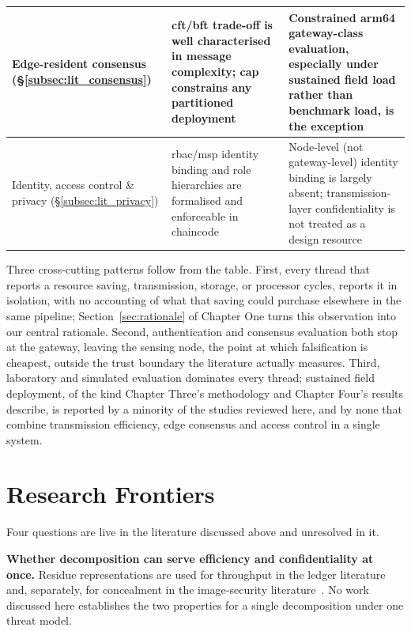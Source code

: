 \begin{table}[htbp]
\begin{tabularx}{\textwidth}{@{}p{}X X@{}}
\midrule
Edge-resident consensus (\S\ref{subsec:lit_consensus})
  & \gls{cft}/\gls{bft} trade-off is well characterised in message
    complexity; \gls{cap} constrains any partitioned deployment
  & Constrained \gls{arm64} gateway-class evaluation, especially under
    sustained field load rather than benchmark load, is the exception \\
\midrule
Identity, access control \& privacy (\S\ref{subsec:lit_privacy})
  & \gls{rbac}/\gls{msp} identity binding and role hierarchies are
    formalised and enforceable in chaincode
  & Node-level (not gateway-level) identity binding is largely absent;
    transmission-layer confidentiality is not treated as a design resource \\
\bottomrule
\end{tabularx}
\end{table}

Three cross-cutting patterns follow from the table. First, every thread
that reports a resource saving, transmission, storage, or processor
cycles, reports it in isolation, with no accounting of what that saving
could purchase elsewhere in the same pipeline; Section~\ref{sec:rationale}
of Chapter One turns this observation into our central rationale.
Second, authentication and consensus evaluation both stop at the gateway,
leaving the sensing node, the point at which falsification is cheapest,
outside the trust boundary the literature actually measures. Third,
laboratory and simulated evaluation dominates every thread; sustained
field deployment, of the kind Chapter Three's methodology and Chapter
Four's results describe, is reported by a minority of the studies
reviewed here, and by none that combine transmission efficiency, edge
consensus and access control in a single system.

\section{Research Frontiers}
\label{sec:lit_frontiers}

Four questions are live in the literature discussed above and unresolved in it.

\textbf{Whether decomposition can serve efficiency and confidentiality at
once.} Residue representations are used for throughput in the ledger
literature~\cite{horvath2025assistedsharding, patel2023blockchainlayer} and,
separately, for concealment in the image-security
literature~\cite{yavuz2025reversibledata}. No work discussed here establishes
the two properties for a single decomposition under one threat model.

